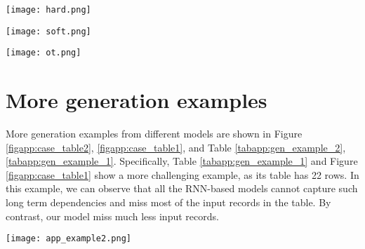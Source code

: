 \documentclass[11pt,a4paper]{article}
\begin{document}
\begin{figure*}
    \centering
    
    \begin{minipage}{0.6\linewidth}
        \texttt{[image: hard.png]}
    \end{minipage}
    \vfill
    \begin{minipage}{0.6\linewidth}
        \texttt{[image: soft.png]}
    \end{minipage}
    \vfill 
    \begin{minipage}{0.6\linewidth}
        \texttt{[image: ot.png]}
    \end{minipage}
    
    \caption{
    Hard matching (top), soft bipartite matching (middle), and optimal transport matching (bottom).}\label{fig:OT_cases}
    \vspace{-0.4cm}
\end{figure*}






\section{More generation examples} \label{app:more_example}
More generation examples from different models are shown in Figure \ref{figapp:case_table2}, \ref{figapp:case_table1}, and Table  \ref{tabapp:gen_example_2}, \ref{tabapp:gen_example_1}.
Specifically, Table \ref{tabapp:gen_example_1} and Figure \ref{figapp:case_table1} show a more challenging example, as its table has 22 rows. In this example, we can observe that all the RNN-based models cannot capture such long term dependencies and miss most of the input records in the table. By contrast, our model miss much less input records.  








\begin{figure*}
    \centering
    \texttt{[image: app\_example2.png]}
    \caption{Example input for different models.}
    \label{figapp:case_table2}
\end{figure*}
\end{document}
